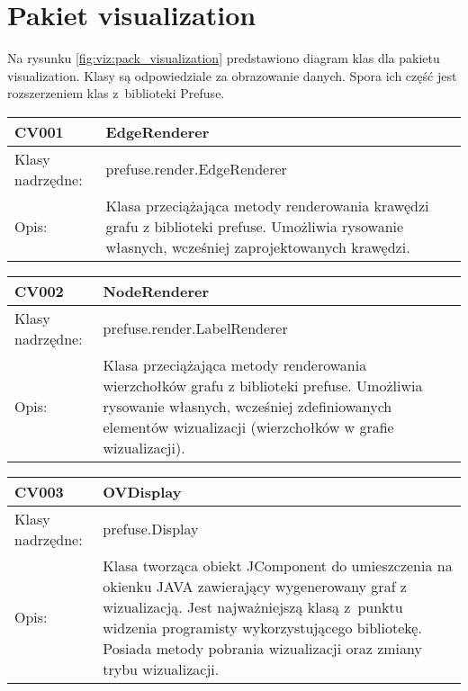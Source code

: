 \section{Pakiet visualization}


Na rysunku  \figurename \space \ref{fig:viz:pack_visualization}  predstawiono diagram klas dla pakietu visualization. Klasy są odpowiedziale za obrazowanie danych. Spora ich część jest rozszerzeniem klas 
z~biblioteki Prefuse. 


 

\begin{longtable}{|m{3.5cm}|m{8.5cm}|} \hline

CV001 & EdgeRenderer \\ \hline
Klasy nadrzędne: &  prefuse.render.EdgeRenderer   \\ \hline
Opis: & Klasa przeciążająca metody renderowania krawędzi grafu z biblioteki prefuse. Umożliwia rysowanie własnych, wcześniej zaprojektowanych krawędzi. \\ \hline

\end{longtable}







\begin{longtable}{|m{3.5cm}|m{8.5cm}|} \hline

CV002 & NodeRenderer \\ \hline
Klasy nadrzędne: &  prefuse.render.LabelRenderer   \\ \hline
Opis: & Klasa przeciążająca metody renderowania wierzchołków grafu z biblioteki prefuse.  Umożliwia rysowanie własnych, 
wcześniej zdefiniowanych elementów wizualizacji (wierzchołków w grafie wizualizacji).  \\ \hline

\end{longtable}




\begin{longtable}{|m{3.5cm}|m{8.5cm}|} \hline

CV003 & OVDisplay \\ \hline
Klasy nadrzędne: &  prefuse.Display   \\ \hline
Opis: &  Klasa tworząca obiekt JComponent do umieszczenia na okienku JAVA zawierający wygenerowany graf z wizualizacją. Jest najważniejszą klasą 
z~punktu widzenia programisty wykorzystującego bibliotekę. Posiada metody pobrania wizualizacji oraz zmiany trybu wizualizacji.    \\ \hline

\end{longtable}

